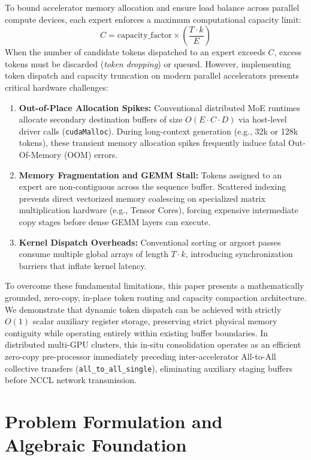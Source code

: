 \documentclass[10pt,twocolumn]{article}
\begin{document}
To bound accelerator memory allocation and ensure load balance across parallel compute devices, each expert enforces a maximum computational capacity limit:
\begin{equation}
    C = \text{capacity\_factor} \times \left( \frac{T \cdot k}{E} \right)
\end{equation}
When the number of candidate tokens dispatched to an expert exceeds $C$, excess tokens must be discarded (\textit{token dropping}) or queued. However, implementing token dispatch and capacity truncation on modern parallel accelerators presents critical hardware challenges:
\begin{enumerate}[nosep, leftmargin=*]
    \item \textbf{Out-of-Place Allocation Spikes:} Conventional distributed MoE runtimes~\cite{shoeybi2019megatron, rajbhandari2022deepspeed} allocate secondary destination buffers of size $O(E \cdot C \cdot D)$ via host-level driver calls (\texttt{cudaMalloc}). During long-context generation (e.g., 32k or 128k tokens), these transient memory allocation spikes frequently induce fatal Out-Of-Memory (OOM) errors.
    \item \textbf{Memory Fragmentation and GEMM Stall:} Tokens assigned to an expert are non-contiguous across the sequence buffer. Scattered indexing prevents direct vectorized memory coalescing on specialized matrix multiplication hardware (e.g., Tensor Cores), forcing expensive intermediate copy stages before dense GEMM layers can execute.
    \item \textbf{Kernel Dispatch Overheads:} Conventional sorting or argsort passes consume multiple global arrays of length $T \cdot k$, introducing synchronization barriers that inflate kernel latency.
\end{enumerate}

To overcome these fundamental limitations, this paper presents a mathematically grounded, zero-copy, in-place token routing and capacity compaction architecture. We demonstrate that dynamic token dispatch can be achieved with strictly $O(1)$ scalar auxiliary register storage, preserving strict physical memory contiguity while operating entirely within existing buffer boundaries. In distributed multi-GPU clusters, this in-situ consolidation operates as an efficient zero-copy pre-processor immediately preceding inter-accelerator All-to-All collective transfers (\texttt{all\_to\_all\_single}), eliminating auxiliary staging buffers before NCCL network transmission.

\section{Problem Formulation and Algebraic Foundation}
\label{sec:formulation}
\end{document}
